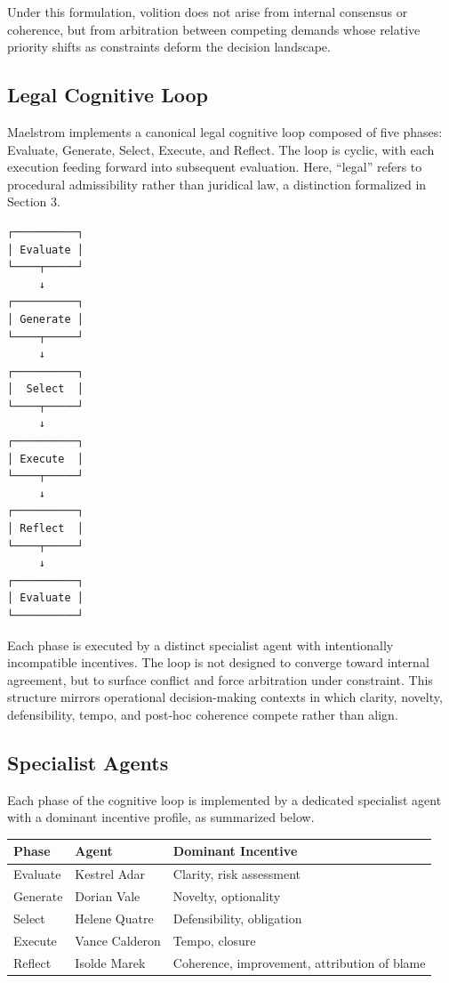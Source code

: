 \documentclass[11pt,a4paper]{article}
\begin{document}
Under this formulation, volition does not arise from internal consensus or coherence, but from arbitration between competing demands whose relative priority shifts as constraints deform the decision landscape.

\subsection{Legal Cognitive Loop}

Maelstrom implements a canonical legal cognitive loop composed of five phases: Evaluate, Generate, Select, Execute, and Reflect. The loop is cyclic, with each execution feeding forward into subsequent evaluation. Here, ``legal'' refers to procedural admissibility rather than juridical law, a distinction formalized in Section 3.

\begin{verbatim}
┌──────────┐
│ Evaluate │
└────┬─────┘
     ↓
┌──────────┐
│ Generate │
└────┬─────┘
     ↓
┌──────────┐
│  Select  │
└────┬─────┘
     ↓
┌──────────┐
│ Execute  │
└────┬─────┘
     ↓
┌──────────┐
│ Reflect  │
└────┬─────┘
     ↓
┌──────────┐
│ Evaluate │
└──────────┘
\end{verbatim}

Each phase is executed by a distinct specialist agent with intentionally incompatible incentives. The loop is not designed to converge toward internal agreement, but to surface conflict and force arbitration under constraint. This structure mirrors operational decision-making contexts in which clarity, novelty, defensibility, tempo, and post-hoc coherence compete rather than align.

\subsection{Specialist Agents}

Each phase of the cognitive loop is implemented by a dedicated specialist agent with a dominant incentive profile, as summarized below.

\begin{center}
\begin{tabular}{lll}
\toprule
\textbf{Phase} & \textbf{Agent} & \textbf{Dominant Incentive} \\
\midrule
Evaluate & Kestrel Adar & Clarity, risk assessment \\
Generate & Dorian Vale & Novelty, optionality \\
Select & Helene Quatre & Defensibility, obligation \\
Execute & Vance Calderon & Tempo, closure \\
Reflect & Isolde Marek & Coherence, improvement, attribution of blame \\
\bottomrule
\end{tabular}
\end{center}
\end{document}

